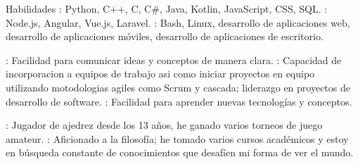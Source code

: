 
\begin{rubric}{Habilidades}
	: Python, C++, C, C\#, Java, Kotlin, JavaScript, CSS, SQL.
	\entry*[Frameworks]: Node.js, Angular, Vue.js, Laravel.
	: Bash, Linux, desarrollo de aplicaciones web, desarrollo de aplicaciones móviles, desarrollo de aplicaciones de escritorio.

	: Facilidad para comunicar ideas y conceptos de manera clara.
	: Capacidad de incorporacion a equipos de trabajo asi como iniciar proyectos en equipo utilizando motodologias agiles como Scrum y cascada; liderazgo en proyectos de desarrollo de software.
	: Facilidad para aprender nuevas tecnologías y conceptos.

	\entry*[Ajedrez]: Jugador de ajedrez desde los 13 años, he ganado varios torneos de juego amateur.
	\entry*[Filosofía]: Aficionado a la filosofía; he tomado varios cursos académicos y estoy en búsqueda constante de conocimientos que desafíen mi forma de ver el mundo.
\end{rubric}

